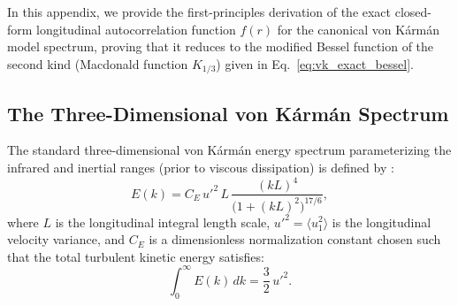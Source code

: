 \documentclass[lineno]{jfm}
\begin{document}
In this appendix, we provide the first-principles derivation \citep{vonKarman1948} of the exact closed-form longitudinal autocorrelation function $f(r)$ for the canonical von K\'arm\'an model spectrum, proving that it reduces to the modified Bessel function of the second kind (Macdonald function $K_{1/3}$) given in Eq.~\eqref{eq:vk_exact_bessel}.

\subsection{The Three-Dimensional von K\'arm\'an Spectrum}
The standard three-dimensional von K\'arm\'an energy spectrum parameterizing the infrared and inertial ranges (prior to viscous dissipation) is defined by \citep{vonKarman1948, Pope2000}:
\begin{equation}
E(k) = C_E\,u'^2\,L\,\frac{(kL)^4}{\big(1 + (kL)^2\big)^{17/6}},
\label{eq:app_vk_3d}
\end{equation}
where $L$ is the longitudinal integral length scale, $u'^2 = \langle u_1^2 \rangle$ is the longitudinal velocity variance, and $C_E$ is a dimensionless normalization constant chosen such that the total turbulent kinetic energy satisfies:
\begin{equation}
\int_0^\infty E(k)\,dk = \frac{3}{2}\,u'^2.
\end{equation}
\end{document}
